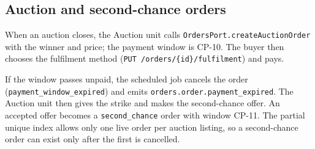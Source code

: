 \documentclass[11pt,a4paper]{article}
\begin{document}
\subsection{Auction and second-chance orders}
\label{sec:auction}
When an auction closes, the Auction unit calls \texttt{OrdersPort.createAuctionOrder} with the winner and price; the payment window is CP-10. The buyer then chooses the fulfilment method (\texttt{PUT /orders/\{id\}/fulfilment}) and pays.

If the window passes unpaid, the scheduled job cancels the order (\texttt{payment\_window\_expired}) and emits \texttt{orders.order.payment\_expired}. The Auction unit then gives the strike and makes the second-chance offer. An accepted offer becomes a \texttt{second\_chance} order with window CP-11. The partial unique index allows only one live order per auction listing, so a second-chance order can exist only after the first is cancelled.
\end{document}
